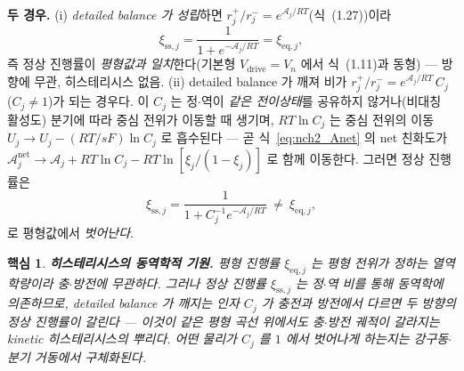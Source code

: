 \documentclass[11pt,a4paper]{article}
\newtheorem*{keybox}{핵심}
\newcommand{\eq}{\mathrm{eq}}
\newcommand{\drive}{\mathrm{drive}}
\newcommand{\sstat}{\mathrm{ss}}
\begin{document}
\textbf{두 경우.} (i) \emph{detailed balance 가 성립}하면 $r_j^+/r_j^-=e^{\mathcal A_j/RT}$(식~(1.27))이라
\begin{equation}
\xi_{\sstat,j}=\frac{1}{1+e^{-\mathcal A_j/RT}}=\xi_{\eq,j},
\label{eq:nch2_ss_eq}
\end{equation}
즉 정상 진행률이 \emph{평형값과 일치}한다(기본형 $V_\drive=V_n$ 에서 식~(1.11)과 동형) — 방향에 무관,
히스테리시스 없음. (ii) detailed balance 가 깨져 비가 $r_j^+/r_j^-=e^{\mathcal A_j/RT}\,C_j$ ($C_j\ne1$)가 되는
경우다. 이 $C_j$ 는 정$\cdot$역이 \emph{같은 전이상태}를 공유하지 않거나(비대칭 활성도) 분기에 따라 중심 전위가
이동할 때 생기며, $RT\ln C_j$ 는 중심 전위의 이동 $U_j\to U_j-(RT/sF)\ln C_j$ 로 흡수된다 — 곧 식~\eqref{eq:nch2_Anet}
의 net 친화도가 $\mathcal A_j^{\mathrm{net}}\to\mathcal A_j+RT\ln C_j-RT\ln[\xi_j/(1-\xi_j)]$ 로 함께 이동한다.
그러면 정상 진행률은
\begin{equation}
\xi_{\sstat,j}=\frac{1}{1+C_j^{-1}e^{-\mathcal A_j/RT}}\ \ne\ \xi_{\eq,j},
\label{eq:nch2_ss_neq}
\end{equation}
로 평형값에서 \emph{벗어난다}.

\begin{keybox}
\textbf{히스테리시스의 동역학적 기원.} 평형 진행률 $\xi_{\eq,j}$ 는 평형 전위가 정하는 열역학량이라 충$\cdot$방전에
무관하다. 그러나 정상 진행률 $\xi_{\sstat,j}$ 는 정$\cdot$역 비를 통해 \emph{동역학}에 의존하므로, detailed balance
가 깨지는 인자 $C_j$ 가 충전과 방전에서 다르면 두 방향의 정상 진행률이 갈린다 — 이것이 같은 평형 곡선 위에서도
충$\cdot$방전 궤적이 갈라지는 \emph{kinetic 히스테리시스}의 뿌리다. 어떤 물리가 $C_j$ 를 $1$ 에서 벗어나게
하는지는 강구동$\cdot$분기 거동에서 구체화된다.
\end{keybox}

\end{document}
